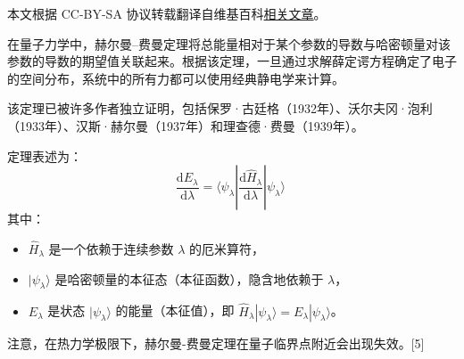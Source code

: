 
本文根据 CC-BY-SA 协议转载翻译自维基百科\href{https://en.wikipedia.org/wiki/Hellmann\%E2\%80\%93Feynman_theorem}{相关文章}。

在量子力学中，赫尔曼–费曼定理将总能量相对于某个参数的导数与哈密顿量对该参数的导数的期望值关联起来。根据该定理，一旦通过求解薛定谔方程确定了电子的空间分布，系统中的所有力都可以使用经典静电学来计算。

该定理已被许多作者独立证明，包括保罗·古廷格（1932年）、沃尔夫冈·泡利（1933年）、汉斯·赫尔曼（1937年）和理查德·费曼（1939年）。

定理表述为：
\[
\frac{\mathrm{d} E_{\lambda}}{\mathrm{d} \lambda} = \langle \psi_{\lambda} | \frac{\mathrm{d} \hat{H}_{\lambda}}{\mathrm{d} \lambda} | \psi_{\lambda} \rangle~
\]
其中：
\begin{itemize}
\item \(\hat{H}_{\lambda}\) 是一个依赖于连续参数 \(\lambda\) 的厄米算符，
\item \(|\psi_{\lambda} \rangle\) 是哈密顿量的本征态（本征函数），隐含地依赖于 \(\lambda\)，
\item \(E_{\lambda}\) 是状态 \(|\psi_{\lambda} \rangle\) 的能量（本征值），即 \(\hat{H}_{\lambda} |\psi_{\lambda} \rangle = E_{\lambda} |\psi_{\lambda} \rangle\)。
\end{itemize}
注意，在热力学极限下，赫尔曼-费曼定理在量子临界点附近会出现失效。[5]